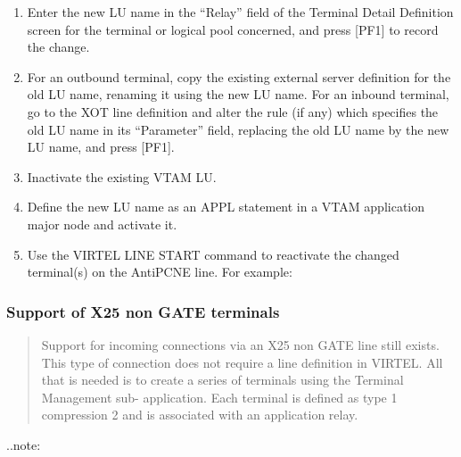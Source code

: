 \documentclass[letterpaper,10pt,english]{sphinxmanual}
\begin{document}
\begin{enumerate}
\item {} 
Enter the new LU name in the “Relay” field of the Terminal Detail Definition screen for the terminal or logical pool concerned, and press {[}PF1{]} to record the change.

\item {} 
For an outbound terminal, copy the existing external server definition for the old LU name, renaming it using the new LU name. For an inbound terminal, go to the XOT line definition and alter the rule (if any) which specifies the old LU name in its “Parameter” field, replacing the old LU name by the new LU name, and press {[}PF1{]}.

\item {} 
Inactivate the existing VTAM LU.

\item {} 
Define the new LU name as an APPL statement in a VTAM application major node and activate it.

\item {} 
Use the VIRTEL LINE START command to reactivate the changed terminal(s) on the AntiPCNE line. For example: 

\end{enumerate}


\subsubsection{Support of X25 non GATE terminals}
\label{\detokenize{connectivity_guide:support-of-x25-non-gate-terminals}}\begin{quote}

Support for incoming connections via an X25 non GATE line still exists. This type of connection does not require a line definition in VIRTEL. All that is needed is to create a series of terminals using the Terminal Management sub- application. Each terminal is defined as type 1 compression 2 and is associated with an application relay.
\end{quote}

..note:

\begin{sphinxVerbatim}[commandchars=\\\{\}]
           
\end{sphinxVerbatim}
\end{document}
